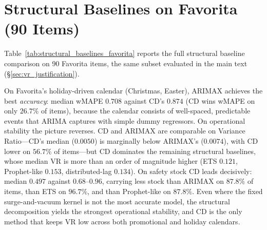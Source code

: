 \documentclass[10pt]{article} %
\theoremstyle{plain}
\theoremstyle{definition}
\begin{document}
\section{Structural Baselines on Favorita (90 Items)}\label{app:favorita_baselines}

Table~\ref{tab:structural_baselines_favorita} reports the full structural baseline comparison on 90 Favorita items, the same subset evaluated in the main text (\S\ref{sec:vr_justification}).

\begin{table}[ht]
\centering
\footnotesize
\setlength{\tabcolsep}{2pt}
\caption{Structural Baselines on Favorita (90 items, global pooled kernel; mean $\pm$ std)}
\label{tab:structural_baselines_favorita}
\end{table}

On Favorita's holiday-driven calendar (Christmas, Easter), ARIMAX achieves the best \emph{accuracy}: median wMAPE $0.708$ against CD's $0.874$ (CD wins wMAPE on only $26.7\%$ of items), because the calendar consists of well-spaced, predictable events that ARIMA captures with simple dummy regressors. On operational stability the picture reverses. CD and ARIMAX are comparable on Variance Ratio---CD's median ($0.0050$) is marginally below ARIMAX's ($0.0074$), with CD lower on $56.7\%$ of items---but CD dominates the remaining structural baselines, whose median VR is more than an order of magnitude higher (ETS $0.121$, Prophet-like $0.153$, distributed-lag $0.134$). On safety stock CD leads decisively: median $0.497$ against $0.68$--$0.96$, carrying less stock than ARIMAX on $87.8\%$ of items, than ETS on $96.7\%$, and than Prophet-like on $87.8\%$. Even where the fixed surge-and-vacuum kernel is not the most accurate model, the structural decomposition yields the strongest operational stability, and CD is the only method that keeps VR low across both promotional and holiday calendars.
\end{document}
